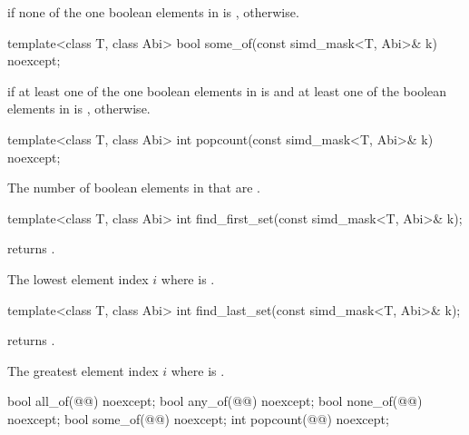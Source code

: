 \begin{itemdescr}
  \pnum\returns
   if none of the one boolean elements in  is ,  otherwise.
\end{itemdescr}

\begin{itemdecl}
template<class T, class Abi> bool some_of(const simd_mask<T, Abi>& k) noexcept;
\end{itemdecl}

\begin{itemdescr}
  \pnum\returns
   if at least one of the one boolean elements in  is  and at least one of the boolean elements in  is ,  otherwise.
\end{itemdescr}

\begin{itemdecl}
template<class T, class Abi> int popcount(const simd_mask<T, Abi>& k) noexcept;
\end{itemdecl}

\begin{itemdescr}
  \pnum\returns
  The number of boolean elements in  that are .
\end{itemdescr}

\begin{itemdecl}
template<class T, class Abi> int find_first_set(const simd_mask<T, Abi>& k);
\end{itemdecl}

\begin{itemdescr}
  \pnum\requires
   returns .

  \pnum\returns
  The lowest element index $i$ where  is .
\end{itemdescr}

\begin{itemdecl}
template<class T, class Abi> int find_last_set(const simd_mask<T, Abi>& k);
\end{itemdecl}

\begin{itemdescr}
  \pnum\requires
   returns .

  \pnum\returns
  The greatest element index $i$ where  is .
\end{itemdescr}

\begin{itemdecl}
bool all_of(@@) noexcept;
bool any_of(@@) noexcept;
bool none_of(@@) noexcept;
bool some_of(@@) noexcept;
int popcount(@@) noexcept;
\end{itemdecl}

